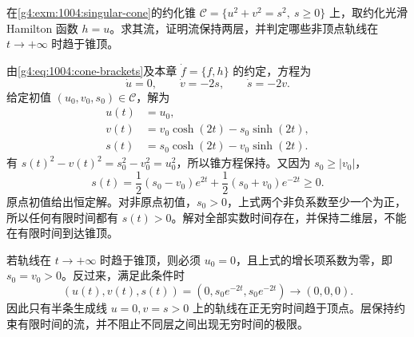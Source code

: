 \begin{optionalexercise}\label{g4:ex:10:cone-hamiltonian-flow}
	在\cref{g4:exm:1004:singular-cone}的约化锥 \(\mathcal C=\{u^2+v^2=s^2,\ s\ge0\}\) 上，取约化光滑 Hamilton 函数 \(h=u\)。求其流，证明流保持两层，并判定哪些非顶点轨线在 \(t\to+\infty\) 时趋于锥顶。
\end{optionalexercise}
\begin{solution}
	由\eqref{g4:eq:1004:cone-brackets}及本章 \(\dot f=\{f,h\}\) 的约定，方程为
	\[
		\dot u=0,\qquad \dot v=-2s,\qquad \dot s=-2v.
	\]
	给定初值 \((u_0,v_0,s_0)\in\mathcal C\)，解为
	\[
		\begin{aligned}
			u(t)&=u_0,\\
			v(t)&=v_0\cosh(2t)-s_0\sinh(2t),\\
			s(t)&=s_0\cosh(2t)-v_0\sinh(2t).
		\end{aligned}
	\]
	有 \(s(t)^2-v(t)^2=s_0^2-v_0^2=u_0^2\)，所以锥方程保持。又因为 \(s_0\ge|v_0|\)，
	\[
		s(t)=\frac12(s_0-v_0)e^{2t}+\frac12(s_0+v_0)e^{-2t}\ge0.
	\]
	原点初值给出恒定解。对非原点初值，\(s_0>0\)，上式两个非负系数至少一个为正，所以任何有限时间都有 \(s(t)>0\)。解对全部实数时间存在，并保持二维层，不能在有限时间到达锥顶。

	若轨线在 \(t\to+\infty\) 时趋于锥顶，则必须 \(u_0=0\)，且上式的增长项系数为零，即 \(s_0=v_0>0\)。反过来，满足此条件时
	\[
		(u(t),v(t),s(t))=(0,s_0e^{-2t},s_0e^{-2t})\longrightarrow(0,0,0).
	\]
	因此只有半条生成线 \(u=0,v=s>0\) 上的轨线在正无穷时间趋于顶点。层保持约束有限时间的流，并不阻止不同层之间出现无穷时间的极限。
\end{solution}
